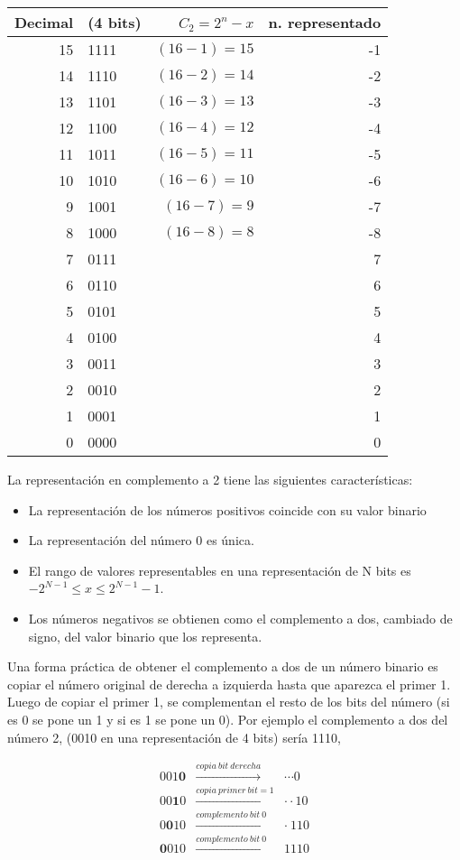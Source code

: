  \begin{table}
 \centering
 \begin{tabular}{r  l  r  r}
 Decimal&  (4 bits) &\ $C_2=2^n-x$ & n. representado\\
 \hline
15& 1111&$(16-1)=15$&-1\\
14& 1110&$(16-2)=14$&-2\\
13& 1101&$(16-3)=13$&-3\\
12& 1100&$(16-4)=12$&-4\\
11& 1011&$(16-5)=11$&-5\\
10& 1010&$(16-6)=10$&-6\\
9& 1001& $(16- 7)=9$&-7\\
8& 1000& $(16-8)=8$&-8\\
\hline
\hline
7& 0111& & 7\\
6& 0110& & 6\\
5& 0101& & 5\\
4& 0100& & 4\\
3& 0011& & 3\\
2& 0010& & 2\\
1& 0001& & 1\\
0& 0000& & 0\\
\hline
\end{tabular}
 \end{table}
 

 La representación en complemento a 2 tiene las siguientes características:
 \begin{itemize}
 \item La representación de los números positivos coincide con su valor binario
 \item La representación del número 0 es única.
 \item El rango de valores representables en una representación de N bits es $-2^{N-1} \le x \le  2^{N-1}-1$.
 \item Los números negativos se obtienen como el complemento a dos, cambiado de signo,  del valor binario que los representa. 
 \end{itemize}

Una forma práctica de obtener el complemento a dos de un número binario es copiar el número original de  derecha a izquierda hasta que aparezca el primer 1. Luego de copiar el primer 1, se complementan el resto de los bits del número (si es 0 se pone un 1 y si es 1 se pone un 0). Por ejemplo el complemento a dos del número 2, (0010 en una representación de 4 bits) sería 1110,

\begin{eqnarray*}
001\mathbf{0} & \xrightarrow{copia\  bit\ derecha }& \cdots 0 \\
00\mathbf{1}0 & \xrightarrow{copia\ primer\ bit = 1}& \cdot \cdot 10\\ 
0 \mathbf{0}10& \xrightarrow{complemento\ bit\  0} &\cdot  \ 110\\
 \mathbf{0}010& \xrightarrow{complemento\ bit\ 0} &1110
\end{eqnarray*} 

